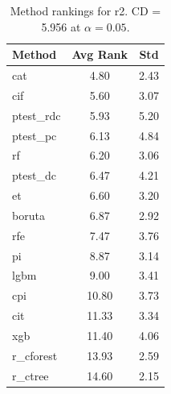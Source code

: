\begin{table}[h]
\centering
\caption{Method rankings for r2. CD = 5.956 at $\alpha=0.05$.}
\label{tab:ranks_r2}
\begin{tabular}{lcc}
\toprule
Method & Avg Rank & Std \\
\midrule
cat & 4.80 & 2.43 \\
cif & 5.60 & 3.07 \\
ptest_rdc & 5.93 & 5.20 \\
ptest_pc & 6.13 & 4.84 \\
rf & 6.20 & 3.06 \\
ptest_dc & 6.47 & 4.21 \\
et & 6.60 & 3.20 \\
boruta & 6.87 & 2.92 \\
rfe & 7.47 & 3.76 \\
pi & 8.87 & 3.14 \\
lgbm & 9.00 & 3.41 \\
cpi & 10.80 & 3.73 \\
cit & 11.33 & 3.34 \\
xgb & 11.40 & 4.06 \\
r_cforest & 13.93 & 2.59 \\
r_ctree & 14.60 & 2.15 \\
\bottomrule
\end{tabular}
\end{table}